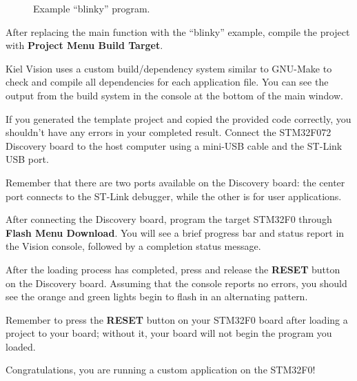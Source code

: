 \documentclass[openany,11pt,fleqn]{book} %
\newcommand{\code}[3]{
    \begin{figure}[]
        \begin{center}
            \hspace*{-3.4cm}
            \colorbox{gray!20!white}{
                \parbox{0.8\paperwidth} {
                    
                }
            }
            \caption{#2}
            \label{#3}
        \end{center}
    \end{figure}
}
\begin{document}
%		

\code{./Files/blinky.c}{Example ``blinky'' program.}{blinky1}

After replacing the main function with the ``blinky'' example, compile the project with \textbf{Project Menu \textrightarrow Build Target}. 

Kiel {\textmu}Vision uses a custom build/dependency system similar to GNU-Make to check and compile all dependencies for each application file. You can see the output from the build system in the console at the bottom of the main window.

If you generated the template project and copied the provided code correctly, you shouldn't have any errors in your completed result. Connect the STM32F072 Discovery board to the host computer using a mini-USB cable and the ST-Link USB port. 

\begin{warning}
	Remember that there are two ports available on the Discovery board: the center port connects to the ST-Link debugger, while the other is for user applications.
\end{warning}

After connecting the Discovery board, program the target STM32F0 through \textbf{Flash Menu \textrightarrow Download}. You will see a brief progress bar and status report in the {\textmu}Vision console, followed by a completion status message. 

After the loading process has completed, press and release the \textbf{RESET} button on the Discovery board. Assuming that the console reports no errors, you should see the orange and green lights begin to flash in an alternating pattern. \\

\begin{warning}
	Remember to press the \textbf{RESET} button on your STM32F0 board after loading a project to your board; without it, your board will not begin the program you loaded.
\end{warning}

Congratulations, you are running a custom application on the STM32F0! 

\end{document}
